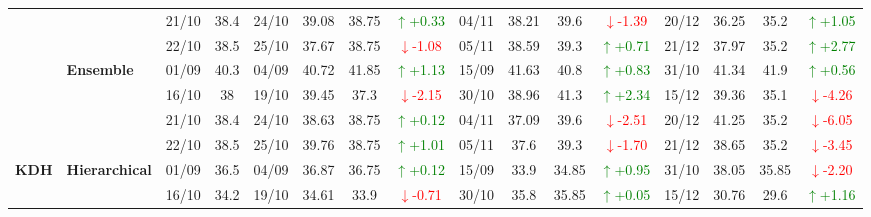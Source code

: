 \documentclass{ieeeaccess}
\begin{document}
{\begin{longtable}{llcc|cccc|cccc|cccc}
& 
& 21/10 & 38.4 & 24/10 & 39.08 & 38.75 & \textcolor{green}{\(\uparrow\)+0.33} & 04/11 & 38.21 & 39.6 & \textcolor{red}{\(\downarrow\)-1.39} & 20/12 & 36.25 & 35.2 & \textcolor{green}{\(\uparrow\)+1.05} \\

&
& 22/10 & 38.5 & 25/10 & 37.67 & 38.75 & \textcolor{red}{\(\downarrow\)-1.08} & 05/11 & 38.59 & 39.3 & \textcolor{green}{\(\uparrow\)+0.71} & 21/12 & 37.97 & 35.2 & \textcolor{green}{\(\uparrow\)+2.77} \\
\cmidrule(lr){2-16}


& \textbf{Ensemble}
& 01/09 & 40.3 & 04/09 & 40.72 & 41.85 & \textcolor{green}{\(\uparrow\)+1.13} & 15/09 & 41.63 & 40.8 & \textcolor{green}{\(\uparrow\)+0.83} & 31/10 & 41.34 & 41.9 & \textcolor{green}{\(\uparrow\)+0.56} \\

& 
& 16/10 & 38 & 19/10 & 39.45 & 37.3 & \textcolor{red}{\(\downarrow\)-2.15} & 30/10 & 38.96 & 41.3 & \textcolor{green}{\(\uparrow\)+2.34} & 15/12 & 39.36 & 35.1 & \textcolor{red}{\(\downarrow\)-4.26} \\

& 
& 21/10 & 38.4 & 24/10 & 38.63 & 38.75 & \textcolor{green}{\(\uparrow\)+0.12} & 04/11 & 37.09 & 39.6 & \textcolor{red}{\(\downarrow\)-2.51} & 20/12 & 41.25 & 35.2 & \textcolor{red}{\(\downarrow\)-6.05} \\

&
& 22/10 & 38.5 & 25/10 & 39.76 & 38.75 & \textcolor{green}{\(\uparrow\)+1.01} & 05/11 & 37.6 & 39.3 & \textcolor{red}{\(\downarrow\)-1.70} & 21/12 & 38.65 & 35.2 & \textcolor{red}{\(\downarrow\)-3.45} \\
\midrule



\multirow{12}{*}{\textbf{KDH}} 
& \textbf{Hierarchical}
& 01/09 & 36.5 & 04/09 & 36.87 & 36.75 & \textcolor{green}{\(\uparrow\)+0.12} & 15/09 & 33.9 & 34.85 & \textcolor{green}{\(\uparrow\)+0.95} & 31/10 & 38.05 & 35.85 & \textcolor{red}{\(\downarrow\)-2.20} \\

&
& 16/10 & 34.2 & 19/10 & 34.61 & 33.9 & \textcolor{red}{\(\downarrow\)-0.71} & 30/10 & 35.8 & 35.85 & \textcolor{green}{\(\uparrow\)+0.05} & 15/12 & 30.76 & 29.6 & \textcolor{green}{\(\uparrow\)+1.16} \\


\end{longtable}}
\end{document}
